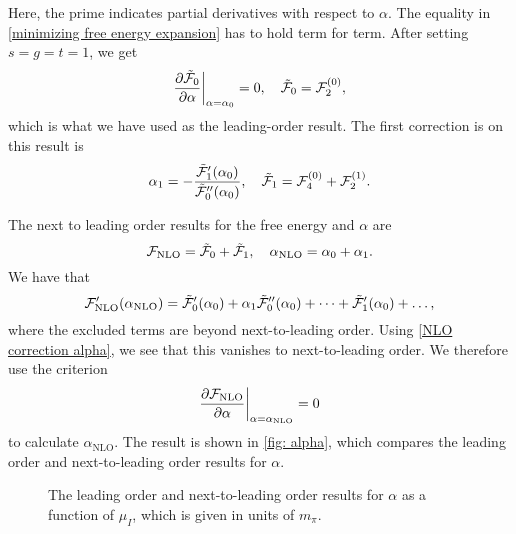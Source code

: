%
Here, the prime indicates partial derivatives with respect to $\alpha$.
The equality in \autoref{minimizing free energy expansion} has to hold term for term.
After setting $s = g = t = 1$, we get
%
\begin{align*}
    \pdv{\tilde {\mathcal{F}}_0}{\alpha}\bigg|_{\alpha=\alpha_0} = 0, \quad
    \tilde {\mathcal{F}}_0 = \mathcal{F}_2^{(0)},
\end{align*}
%
which is what we have used as the leading-order result. 
The first correction is on this result is
%
\begin{equation}
    \label{NLO correction alpha}
    \alpha_1 = - \frac{\tilde {\mathcal{F}}_1'(\alpha_0)}{{\tilde {\mathcal{F}}_0''(\alpha_0)}},
    \quad 
    \tilde {\mathcal{F}}_1 = \mathcal{F}_{4}^{(0)} + \mathcal{F}_{2}^{(1)}.
\end{equation}
%

The next to leading order results for the free energy and $\alpha$ are
%
\begin{equation}
    \mathcal{F}_\mathrm{NLO} = \tilde {\mathcal{F}}_0 + \tilde {\mathcal{F}}_1, \quad
    \alpha_\mathrm{NLO} = \alpha_0 + \alpha_1.
\end{equation}
%
We have that
%
\begin{equation}
    \mathcal{F}_\mathrm{NLO}'(\alpha_\mathrm{NLO})
    = \tilde {\mathcal{F}}_0'(\alpha_0) + \alpha_1 \tilde {\mathcal{F}}_0''(\alpha_0) + \dots
    + \tilde {\mathcal{F}}_1'(\alpha_0) + \dots,
\end{equation}
%
where the excluded terms are beyond next-to-leading order.
Using \autoref{NLO correction alpha}, we see that this vanishes to next-to-leading order.
We therefore use the criterion
%
\begin{equation}
    \label{alpha nlo method 2}
    \pdv{\mathcal{F}_\mathrm{NLO}}{\alpha} \bigg|_{\alpha=\alpha_{\mathrm{NLO}}} = 0
\end{equation}
%
to calculate $\alpha_\text{NLO}$.
The result is shown in \autoref{fig: alpha}, which compares the leading order and next-to-leading order results for $\alpha$.

\begin{figure}
    \centering
    \caption{The leading order and next-to-leading order results for $\alpha$ as a function of $\mu_I$, which is given in units of $m_\pi$. }
    \label{fig: alpha}
\end{figure}

